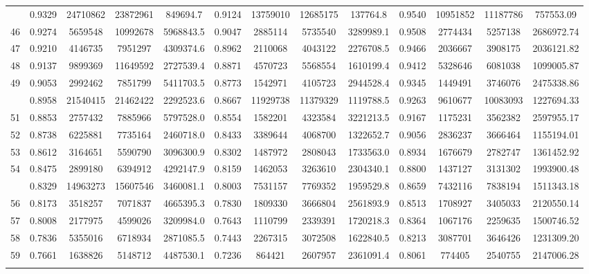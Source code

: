 \documentclass[
  12pt,
]{article}
\begin{document}
\begin{longtable}[t]{lcccccccccccc}
\addlinespace
45 & 0.9329 & 24710862 & 23872961 & 849694.7 & 0.9124 & 13759010 & 12685175 & 137764.8 & 0.9540 & 10951852 & 11187786 & 757553.09\\
46 & 0.9274 & 5659548 & 10992678 & 5968843.5 & 0.9047 & 2885114 & 5735540 & 3289989.1 & 0.9508 & 2774434 & 5257138 & 2686972.74\\
47 & 0.9210 & 4146735 & 7951297 & 4309374.6 & 0.8962 & 2110068 & 4043122 & 2276708.5 & 0.9466 & 2036667 & 3908175 & 2036121.82\\
48 & 0.9137 & 9899369 & 11649592 & 2727539.4 & 0.8871 & 4570723 & 5568554 & 1610199.4 & 0.9412 & 5328646 & 6081038 & 1099005.87\\
49 & 0.9053 & 2992462 & 7851799 & 5411703.5 & 0.8773 & 1542971 & 4105723 & 2944528.4 & 0.9345 & 1449491 & 3746076 & 2475338.86\\
\addlinespace
50 & 0.8958 & 21540415 & 21462422 & 2292523.6 & 0.8667 & 11929738 & 11379329 & 1119788.5 & 0.9263 & 9610677 & 10083093 & 1227694.33\\
51 & 0.8853 & 2757432 & 7885966 & 5797528.0 & 0.8554 & 1582201 & 4323584 & 3221213.5 & 0.9167 & 1175231 & 3562382 & 2597955.17\\
52 & 0.8738 & 6225881 & 7735164 & 2460718.0 & 0.8433 & 3389644 & 4068700 & 1322652.7 & 0.9056 & 2836237 & 3666464 & 1155194.01\\
53 & 0.8612 & 3164651 & 5590790 & 3096300.9 & 0.8302 & 1487972 & 2808043 & 1733563.0 & 0.8934 & 1676679 & 2782747 & 1361452.92\\
54 & 0.8475 & 2899180 & 6394912 & 4292147.9 & 0.8159 & 1462053 & 3263610 & 2304340.1 & 0.8800 & 1437127 & 3131302 & 1993900.48\\
\addlinespace
55 & 0.8329 & 14963273 & 15607546 & 3460081.1 & 0.8003 & 7531157 & 7769352 & 1959529.8 & 0.8659 & 7432116 & 7838194 & 1511343.18\\
56 & 0.8173 & 3518257 & 7071837 & 4665395.3 & 0.7830 & 1809330 & 3666804 & 2561893.9 & 0.8513 & 1708927 & 3405033 & 2120550.14\\
57 & 0.8008 & 2177975 & 4599026 & 3209984.0 & 0.7643 & 1110799 & 2339391 & 1720218.3 & 0.8364 & 1067176 & 2259635 & 1500746.52\\
58 & 0.7836 & 5355016 & 6718934 & 2871085.5 & 0.7443 & 2267315 & 3072508 & 1622840.5 & 0.8213 & 3087701 & 3646426 & 1231309.20\\
59 & 0.7661 & 1638826 & 5148712 & 4487530.1 & 0.7236 & 864421 & 2607957 & 2361091.4 & 0.8061 & 774405 & 2540755 & 2147006.28\\
\addlinespace

\end{longtable}
\end{document}
